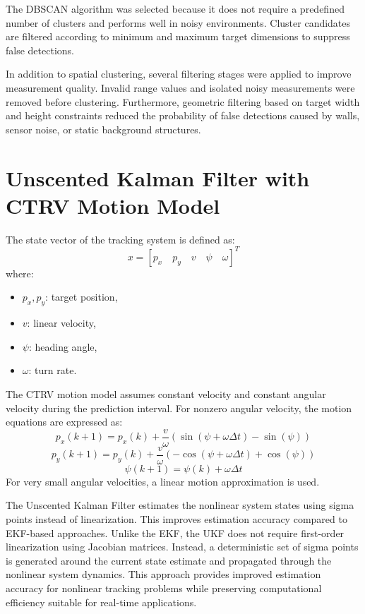 \documentclass[conference]{IEEEtran}
\begin{document}
The DBSCAN algorithm was selected because it does not require a predefined number of clusters and performs well in noisy environments. Cluster candidates are filtered according to minimum and maximum target dimensions to suppress false detections.

In addition to spatial clustering, several filtering stages were applied to improve measurement quality. Invalid range values and isolated noisy measurements were removed before clustering. Furthermore, geometric filtering based on target width and height constraints reduced the probability of false detections caused by walls, sensor noise, or static background structures.

\section{Unscented Kalman Filter with CTRV Motion Model}
The state vector of the tracking system is defined as:
\begin{equation}
x = [p_{x} \quad p_{y} \quad v \quad \psi \quad \omega]^T
\end{equation}
where:
\begin{itemize}
    \item $p_{x}, p_{y}$: target position,
    \item $v$: linear velocity,
    \item $\psi$: heading angle,
    \item $\omega$: turn rate.
\end{itemize}

The CTRV motion model assumes constant velocity and constant angular velocity during the prediction interval. For nonzero angular velocity, the motion equations are expressed as:
\begin{equation}
p_{x}(k+1)=p_{x}(k)+\frac{v}{\omega}(\sin(\psi+\omega\Delta t)-\sin(\psi))
\end{equation}
\begin{equation}
p_{y}(k+1)=p_{y}(k)+\frac{v}{\omega}(-\cos(\psi+\omega\Delta t)+\cos(\psi))
\end{equation}
\begin{equation}
\psi(k+1)=\psi(k)+\omega\Delta t
\end{equation}
For very small angular velocities, a linear motion approximation is used.

The Unscented Kalman Filter estimates the nonlinear system states using sigma points instead of linearization. This improves estimation accuracy compared to EKF-based approaches. Unlike the EKF, the UKF does not require first-order linearization using Jacobian matrices. Instead, a deterministic set of sigma points is generated around the current state estimate and propagated through the nonlinear system dynamics. This approach provides improved estimation accuracy for nonlinear tracking problems while preserving computational efficiency suitable for real-time applications.
\end{document}
